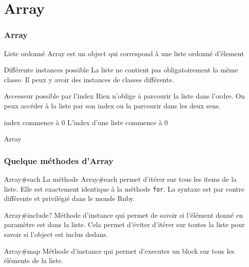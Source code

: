 \documentclass{beamer}
\begin{document}
\section{Array}

\begin{frame}
  \frametitle{Array}
  \begin{block}{Liste ordonn\'e}
    Array est un object qui correspond à une liste ordonn\'e d'\'element
  \end{block}
  \begin{block}{Diff\'erente instances possible}
    La liste ne contient pas obligatoirement la même classe. Il peux y avoir des instances de classes diff\'erente.
  \end{block}
  \begin{block}{Accesseur possible par l'index}
    Rien n'oblige à parcourir la liste dans l'ordre. On peux acc\'eder à la liste par son index ou la parcourir dans les deux sens.
  \end{block}
  \begin{block}{index commence à 0}
    L'index d'une liste commence à 0
  \end{block}
\end{frame}

\begin{frame}
  \begin{beamerboxesrounded}{Array}
    
  \end{beamerboxesrounded}
\end{frame}

\begin{frame}
  \frametitle{Quelque m\'ethodes d'Array}
  \begin{block}{Array\#each}
    La m\'ethode Array\#each permet d'it\'erer sur tous les items de la liste.
    Elle est exactement identique à la m\'ethode \verb?for?. La syntaxe est par contre diff\'erente et privil\'egi\'e dans le monde Ruby.
  \end{block}
  \begin{block}{Array\#include?}
    M\'ethode d'instance qui permet de savoir si l'\'el\'ement donn\'e en paramètre est dans la liste. Cela permet d'\'eviter d'it\'erer sur toutes
    la liste pour savoir si l'object est inclus dedans.
  \end{block}
  \begin{block}{Array\#map}
    M\'ethode d'instance qui permet d'executer un block sur tous les \'el\'ements de la liste.
  \end{block}
\end{frame}
\end{document}
